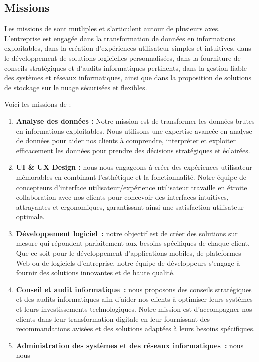 \subsection{Missions}
Les missions de \firm sont mutliples et s’articulent autour de plusieurs axes. L’entreprise
est engagée dans la transformation de données en informations exploitables, dans
la création d’expériences utilisateur simples et intuitives, dans le développement de solutions
logicielles personnalisées, dans la fourniture de conseils stratégiques et d’audits
informatiques pertinents, dans la gestion fiable des systèmes et réseaux informatiques,
ainsi que dans la proposition de solutions de stockage sur le nuage sécurisées et flexibles.

Voici les missions de \firm :
\begin{enumerate}
  \item \textbf{Analyse des données :} Notre mission est de transformer les données brutes
    en informations exploitables. Nous utilisons une expertise avancée en analyse
    de données pour aider nos clients à comprendre, interpréter et exploiter efficacement
    les données pour prendre des décisions stratégiques et éclairées.
  \item \textbf{UI \& UX Design :} nous nous engageons à créer des expériences utilisateur mémorables
    en combinant l’esthétique et la fonctionnalité. Notre équipe de concepteurs
    d’interface utilisateur/expérience utilisateur travaille en étroite collaboration
    avec nos clients pour concevoir des interfaces intuitives, attrayantes et ergonomiques,
    garantissant ainsi une satisfaction utilisateur optimale.
  \item \textbf{Développement logiciel :} notre objectif est de créer des solutions sur
    mesure qui répondent parfaitement aux besoins spécifiques de chaque client.
    Que ce soit pour le développement d’applications mobiles, de plateformes Web
    ou de logiciels d’entreprise, notre équipe de développeurs s’engage à fournir
    des solutions innovantes et de haute qualité.
  \item \textbf{Conseil et audit informatique :} nous proposons des conseils stratégiques
    et des audits informatiques afin d’aider nos clients à optimiser leurs systèmes
    et leurs investissements technologiques. Notre mission est d’accompagner nos
    clients dans leur transformation digitale en leur fournissant des recommandations
    avisées et des solutions adaptées à leurs besoins spécifiques.
  \item \textbf{Administration des systèmes et des réseaux informatiques :} nous nous

\end{enumerate}
